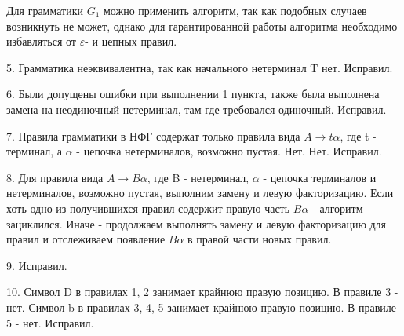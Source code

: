 \documentclass[a4paper,14pt]{extarticle}
\begin{document}
Для грамматики $G_1$ можно применить алгоритм, так как подобных случаев возникнуть не может, 
однако для гарантированной работы алгоритма необходимо избавляться от $\varepsilon$- и цепных 
правил.

5. Грамматика неэквивалентна, так как начального нетерминал T нет. Исправил.

6. Были допущены ошибки при выполнении 1 пункта, также была выполнена замена на неодиночный нетерминал, там где требовался одиночный. Исправил.

7. Правила грамматики в НФГ содержат только правила вида $A \rightarrow t\alpha$, где t - терминал, а 
$\alpha$ - цепочка нетерминалов, возможно пустая. Нет. Нет. Исправил.

8. Для правила вида $A \rightarrow B\alpha$, где B - нетерминал, $\alpha$ - цепочка
терминалов и нетерминалов, возможно пустая, выполним 
замену и левую факторизацию. Если хоть одно из получившихся правил содержит правую часть
$B\alpha$ - алгоритм зациклился. Иначе - продолжаем выполнять замену и левую факторизацию 
для правил и отслеживаем появление $B\alpha$ в правой части новых правил. 

9. Исправил.

10. Символ D в правилах 1, 2 занимает крайнюю правую позицию. В правиле 3 - нет.
Символ b в правилах 3, 4, 5 занимает крайнюю правую позицию. В правиле 5 - нет.
Исправил.
\end{document}
